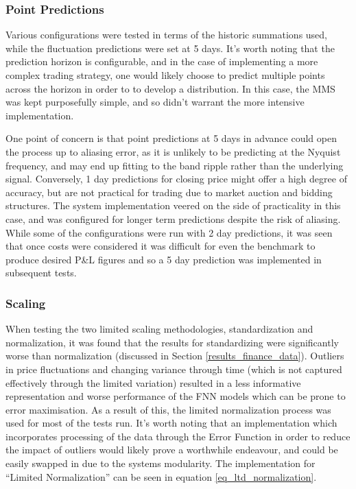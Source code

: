 \documentclass[a4paper,11pt,oneside]{article}
\theoremstyle{plain}
\theoremstyle{definition}
\begin{document}
	\subsubsection {Point Predictions} Various configurations were tested in terms of the historic summations used, while the fluctuation predictions were set at 5 days. It's worth noting that the prediction horizon is configurable, and in the case of implementing a more complex trading strategy, one would likely choose to predict multiple points across the horizon in order to to develop a distribution. In this case, the MMS was kept purposefully simple, and so didn't warrant the more intensive implementation. \newline
	
	One point of concern is that point predictions at 5 days in advance could open the process up to aliasing error, as it is unlikely to be predicting at the Nyquist frequency, and may end up fitting to the band ripple rather than the underlying signal. Conversely, 1 day predictions for closing price might offer a high degree of accuracy, but are not practical for trading due to market auction and bidding structures. The system implementation veered on the side of practicality in this case, and was configured for longer term predictions despite the risk of aliasing. While some of the configurations were run with 2 day predictions, it was seen that once costs were considered it was difficult for even the benchmark to produce desired P\&L figures and so a 5 day prediction was implemented in subsequent tests.
	
	
	
	\subsubsection {Scaling} When testing the two limited scaling methodologies, standardization and normalization, it was found that the results for standardizing were significantly worse than normalization (discussed in Section \ref{results_finance_data}). Outliers in price fluctuations and changing variance through time (which is not captured effectively through the limited variation) resulted in a less informative representation and worse performance of the FNN models which can be prone to error maximisation. As a result of this, the limited normalization process was used for most of the tests run. It's worth noting that an implementation which incorporates processing of the data through the Error Function in order to reduce the impact of outliers would likely prove a worthwhile endeavour, and could be easily swapped in due to the systems modularity. The implementation for ``Limited Normalization'' can be seen in equation \eqref{eq_ltd_normalization}.\newline
	
\end{document}
